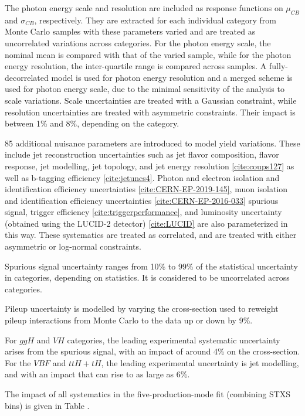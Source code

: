 The photon energy scale and resolution are included as response functions on $\mu_{CB}$ and $\sigma_{CB}$, respectively. They are extracted for each individual category from Monte Carlo samples with these parameters varied and are treated as uncorrelated variations across categories. For the photon energy scale, the nominal mean is compared with that of the varied sample, while for the photon energy resolution, the inter-quartile range is compared across samples. A fully-decorrelated model is used for photon energy resolution and a merged scheme is used for photon energy scale, due to the minimal sensitivity of the analysis to scale variations. Scale uncertainties are treated with a Gaussian constraint, while resolution uncertainties are treated with asymmetric constraints. Their impact is between 1\% and 8\%, depending on the category.

85 additional nuisance parameters are introduced to model yield variations. These include jet reconstruction uncertainties such as jet flavor composition, flavor response, jet modelling, jet topology, and jet energy resolution \ref{cite:coups127} as well as b-tagging efficiency \ref{cite:jetuncs4}. Photon and electron isolation and identification efficiency uncertainties \ref{cite:CERN-EP-2019-145}, muon isolation and identification efficiency uncertainties \ref{cite:CERN-EP-2016-033} spurious signal, trigger efficiency \ref{cite:triggerperformance}, and luminosity uncertainty (obtained using the LUCID-2 detector) \ref{cite:LUCID} are also parameterized in this way. These systematics are treated as correlated, and are treated with either asymmetric or log-normal constraints.

Spurious signal uncertainty ranges from 10\% to 99\% of the statistical uncertainty in categories, depending on statistics. It is considered to be uncorrelated across categories.

Pileup uncertainty is modelled by varying the cross-section used to reweight pileup interactions from Monte Carlo to the data up or down by 9\%. 

For $ggH$ and $VH$ categories, the leading experimental systematic uncertainty arises from the spurious signal, with an impact of around 4\% on the cross-section. For the $VBF$ and $ttH+tH$, the leading experimental uncertainty is jet modelling, and with an impact that can rise to as large as 6\%.

The impact of all systematics in the five-production-mode fit (combining STXS bins) is given in Table \label{tab:result:systematic}. 

